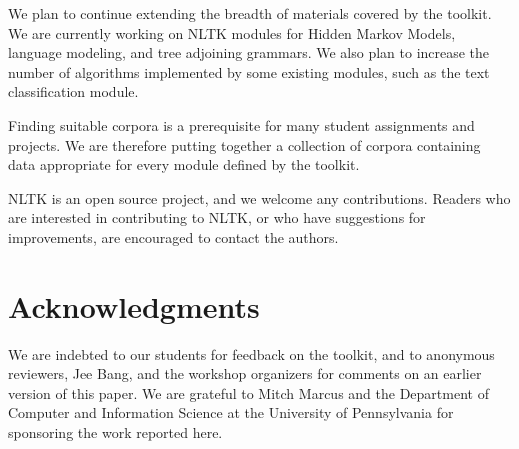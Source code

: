 \documentclass[11pt]{article}
\begin{document}

We plan to continue extending the breadth of materials covered by
the toolkit.  We are currently working on NLTK modules for Hidden
Markov Models, language modeling, and tree adjoining grammars.  We
also plan to increase the number of algorithms implemented by some
existing modules, such as the text classification module.

Finding suitable corpora is a prerequisite for many student assignments and
projects.  We are therefore putting together a collection of corpora
containing data appropriate for every module defined by the toolkit.

NLTK is an open source project, and we welcome any contributions.
Readers who are interested in contributing to NLTK, or who have
suggestions for improvements, are encouraged to contact the authors.


\section{Acknowledgments}
\label{sec:acknowledgments}

We are indebted to our students for feedback on the toolkit, and to
anonymous reviewers, Jee Bang, and the workshop organizers for
comments on an earlier version of this paper.  We are grateful to
Mitch Marcus and the Department of Computer and Information Science at
the University of Pennsylvania for sponsoring the work reported here.



\end{document}
